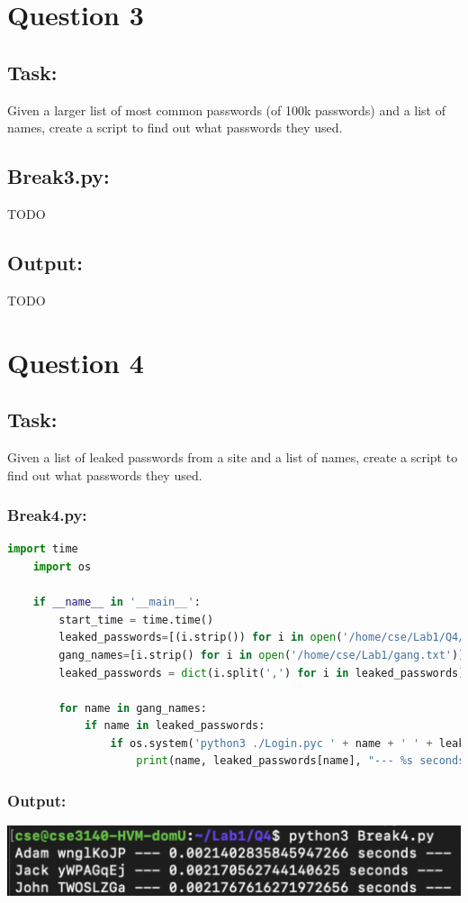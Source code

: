 \documentclass{article}
\begin{document}
\section{Question 3}
\subsection*{Task:}
Given a larger list of most common passwords (of 100k passwords) and a list of names, 
create a script to find out what passwords they used.

\subsection*{Break3.py:}
TODO
\subsection*{Output:}
TODO
\section{Question 4}
\subsection*{Task:}
Given a list of leaked passwords from a site and a list of names, create a script to
find out what passwords they used.

\subsubsection*{Break4.py:}
\begin{lstlisting}[language=Python]
    import time
    import os

    if __name__ in '__main__':
        start_time = time.time()
        leaked_passwords=[(i.strip()) for i in open('/home/cse/Lab1/Q4/PwnedPWfile')]
        gang_names=[i.strip() for i in open('/home/cse/Lab1/gang.txt')]
        leaked_passwords = dict(i.split(',') for i in leaked_passwords)

        for name in gang_names:
            if name in leaked_passwords:
                if os.system('python3 ./Login.pyc ' + name + ' ' + leaked_passwords[name] + " >/dev/null 2>&1") == 0:
                    print(name, leaked_passwords[name], "--- %s seconds ---" % (time.time() - start_time))
\end{lstlisting}

\subsubsection*{Output:}
\begin{center}
    \includegraphics[scale=.5]{images/Q4_Output.png}
\end{center}
\end{document}
